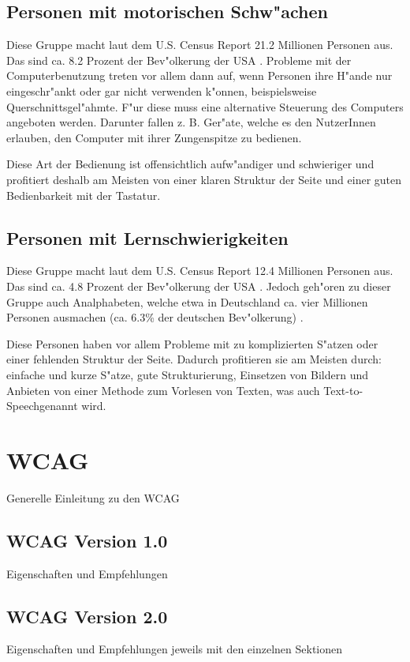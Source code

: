 \documentclass[a4paper,bibtotoc,oneside]{scrbook}
\begin{document}
\section{Personen mit motorischen Schw"achen}
Diese Gruppe macht laut dem U.S. Census Report 21.2 Millionen Personen aus. Das
sind ca. 8.2 Prozent der Bev"olkerung der USA \cite[S. 1]{us_cens}. Probleme mit der Computerbenutzung treten vor allem dann auf, wenn Personen ihre H"ande nur eingeschr"ankt oder gar nicht verwenden k"onnen, beispielsweise Querschnittsgel"ahmte. F"ur diese muss eine alternative Steuerung des Computers angeboten werden. Darunter fallen z. B. Ger"ate, welche es den NutzerInnen erlauben, den Computer mit ihrer Zungenspitze zu bedienen.\cite[S. 15-16]{barr_webd}

Diese Art der Bedienung ist offensichtlich aufw"andiger und schwieriger und profitiert deshalb am Meisten von einer klaren Struktur der Seite und einer guten Bedienbarkeit mit der Tastatur.\cite[S. 15-16]{barr_webd}\cite[S. 18]{understand_acc}

\section{Personen mit Lernschwierigkeiten}
Diese Gruppe macht laut dem U.S. Census Report 12.4 Millionen Personen aus. Das
sind ca. 4.8 Prozent der Bev"olkerung der USA \cite[S. 1]{us_cens}. Jedoch geh"oren zu dieser Gruppe auch Analphabeten, welche etwa in Deutschland ca. vier Millionen Personen ausmachen (ca. 6.3\% der deutschen Bev"olkerung) \cite[S. 19]{understand_acc}.

Diese Personen haben vor allem Probleme mit zu komplizierten S"atzen oder einer fehlenden Struktur der Seite. Dadurch profitieren sie am Meisten durch: einfache und kurze S"atze, gute Strukturierung, Einsetzen von Bildern und Anbieten von einer Methode zum Vorlesen von Texten, was auch \glqq Text-to-Speech\grqq genannt wird. \cite[S. 18-19]{barr_webd}\cite[S. 19]{understand_acc}

\chapter{WCAG}
Generelle Einleitung zu den WCAG

\section{WCAG Version 1.0}
Eigenschaften und Empfehlungen 

\section{WCAG Version 2.0}
Eigenschaften und Empfehlungen jeweils mit den einzelnen Sektionen
\end{document}
